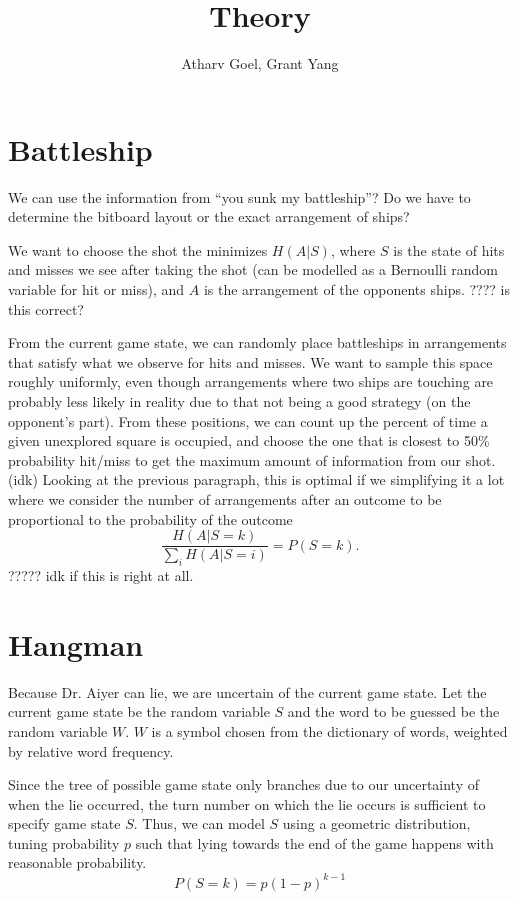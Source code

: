 



    \title{Theory}
    \author{Atharv Goel, Grant Yang}
    \maketitle

    \section{Battleship}

    We can use the information from ``you sunk my battleship''? Do we have to determine the bitboard layout or the exact arrangement of ships?

    We want to choose the shot the minimizes $H(A | S)$, where $S$ is the state of hits and misses we see after taking the shot (can be modelled as a Bernoulli random variable for hit or miss), and $A$ is the arrangement of the opponents ships. ???? is this correct?

    From the current game state, we can randomly place battleships in arrangements that satisfy what we observe for hits and misses. We want to sample this space roughly uniformly, even though arrangements where two ships are touching are probably less likely in reality due to that not being a good strategy (on the opponent's part). From these positions, we can count up the percent of time a given unexplored square is occupied, and choose the one that is closest to 50\% probability hit/miss to get the maximum amount of information from our shot. (idk) Looking at the previous paragraph, this is optimal if we simplifying it a lot where we consider the number of arrangements after an outcome to be proportional to the probability of the outcome \[\frac{H(A | S = k)}{\sum_i H(A | S = i)} = P(S=k).\] ????? idk if this is right at all. 

    \newpage

    \section{Hangman}

    Because Dr. Aiyer can lie, we are uncertain of the current game state. Let the current game state be the random variable $S$ and the word to be guessed be the random variable $W$. $W$ is a symbol chosen from the dictionary of words, weighted by relative word frequency. 
    
    Since the tree of possible game state only branches due to our uncertainty of when the lie occurred, the turn number on which the lie occurs is sufficient to specify game state $S$. Thus, we can model $S$ using a geometric distribution, tuning probability $p$ such that lying towards the end of the game happens with reasonable probability.
    \[ P(S = k) = p (1-p)^{k-1}\]

